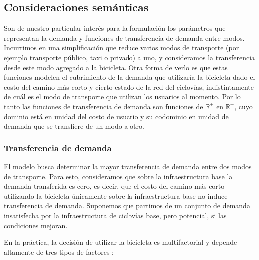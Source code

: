 \documentclass{article}
\begin{document}
  \subsection{Consideraciones semánticas}

  Son de nuestro particular interés para la formulación los parámetros que representan la demanda y funciones de transferencia de demanda entre modos. Incurrimos en una simplificación que reduce varios modos de transporte (por ejemplo transporte público, taxi o privado) a uno, y consideramos la transferencia desde este modo agregado a la bicicleta. Otra forma de verlo es que estas funciones modelen el cubrimiento de la demanda que utilizaría la bicicleta dado el costo del camino más corto y cierto estado de la red del ciclovías, indistintamente de cuál es el modo de transporte que utilizan los usuarios al momento. Por lo tanto las funciones de transferencia de demanda son funciones de $\mathbb{R}^+$ en $\mathbb{R}^+$, cuyo dominio está en unidad del costo de usuario y su codominio en unidad de demanda que se transfiere de un modo a otro.

  \subsubsection*{Transferencia de demanda}

  El modelo busca determinar la mayor transferencia de demanda entre dos modos de transporte. Para esto, consideramos que sobre la infraestructura base la demanda transferida es cero, es decir, que el costo del camino más corto utilizando la bicicleta únicamente sobre la infraestructura base no induce transferencia de demanda. Suponemos que partimos de un conjunto de demanda insatisfecha por la infraestructura de ciclovías base, pero potencial, si las condiciones mejoran.

  En la práctica, la decisión de utilizar la bicicleta es multifactorial y depende altamente de tres tipos de factores \cite{ortuz2011}:
\end{document}
